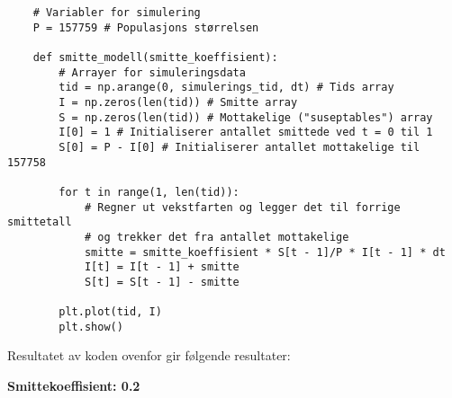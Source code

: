 \documentclass[12pt]{article}
\begin{document}
\begin{Codesnippet}
    \begin{verbatim}
    # Variabler for simulering
    P = 157759 # Populasjons størrelsen

    def smitte_modell(smitte_koeffisient):
        # Arrayer for simuleringsdata
        tid = np.arange(0, simulerings_tid, dt) # Tids array
        I = np.zeros(len(tid)) # Smitte array
        S = np.zeros(len(tid)) # Mottakelige ("suseptables") array
        I[0] = 1 # Initialiserer antallet smittede ved t = 0 til 1
        S[0] = P - I[0] # Initialiserer antallet mottakelige til 157758

        for t in range(1, len(tid)):
            # Regner ut vekstfarten og legger det til forrige smittetall
            # og trekker det fra antallet mottakelige
            smitte = smitte_koeffisient * S[t - 1]/P * I[t - 1] * dt
            I[t] = I[t - 1] + smitte
            S[t] = S[t - 1] - smitte

        plt.plot(tid, I)
        plt.show()
    \end{verbatim}
\end{Codesnippet}

Resultatet av koden ovenfor gir følgende resultater:
\newpage
\begin{center}
    \large{\textbf{Smittekoeffisient: 0.2}}\\
    \hphantom{---------}\\
    \hphantom{---------}
\end{center}
\end{document}
